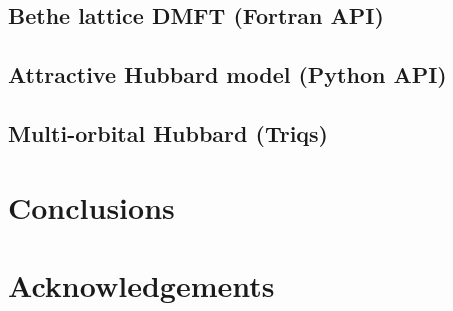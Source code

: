 \documentclass[final,3p,10pt]{elsarticle}
\begin{document}
\subsection{Bethe lattice DMFT (Fortran API)}
\subsection{Attractive Hubbard model (Python API)}
\subsection{Multi-orbital Hubbard (Triqs)}














\section{Conclusions}










\section*{Acknowledgements}





\end{document}
